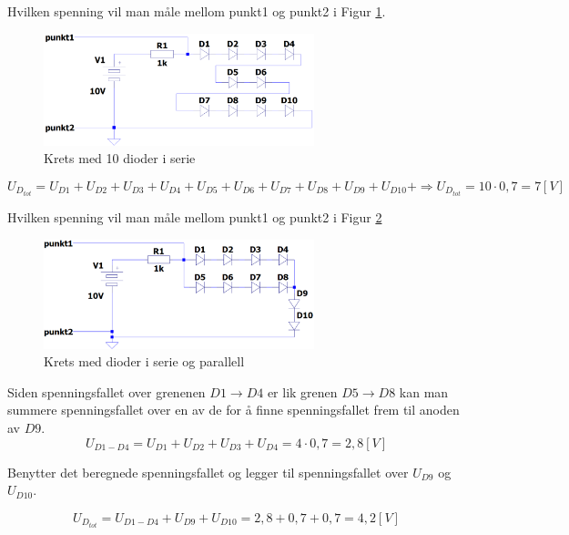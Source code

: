 \begin{question}[name=Spørsmål, topic=dioder]
Hvilken spenning vil man måle mellom punkt1 og punkt2 i Figur \ref{fig:10Dserie}.

	\begin{figure}[H]
		\centering
		\includegraphics[width=0.7\textwidth]{diode/figurer/10SerieD.png}
		\caption{Krets med 10 dioder i serie}
		\label{fig:10Dserie}
	\end{figure}

\end{question}


\begin{solution}[name=Løsningsforslag oppgave]
\[U_{D_{tot}}=U_{D1}+U_{D2}+U_{D3}+U_{D4}+U_{D5}+U_{D6}+U_{D7}+U_{D8}+U_{D9}+U_{D10}+\Rightarrow U_{D_{tot}}=10\cdot0,7=7 [V]\] 
\end{solution}


\begin{question}[name=Spørsmål, topic=dioder]
Hvilken spenning vil man måle mellom punkt1 og punkt2 i Figur \ref{fig:DserieParaMix}
	
	\begin{figure}[H]
	\centering
	\includegraphics[width=0.7\textwidth]{diode/figurer/6serieOgParaD.png}
	\caption{Krets med dioder i serie og parallell}
	\label{fig:DserieParaMix}
	\end{figure}
	
	
\end{question}


\begin{solution}[name=Løsningsforslag oppgave]
Siden spenningsfallet over grenenen $D1 \rightarrow D4$ er lik grenen $D5 \rightarrow D8$ kan man summere spenningsfallet over en av de for å finne spenningsfallet frem til anoden av $D9$.
\[U_{D1-D4}=U_{D1}+U_{D2}+U_{D3}+U_{D4}= 4\cdot0,7=2,8[V]\]

Benytter det beregnede spenningsfallet og legger til spenningsfallet over $U_{D9}$ og $U_{D10}$.

\[U_{D_{tot}}=U_{D1-D4}+U_{D9}+U_{D10}=2,8+0,7+0,7=4,2 [V]\]

\end{solution}






